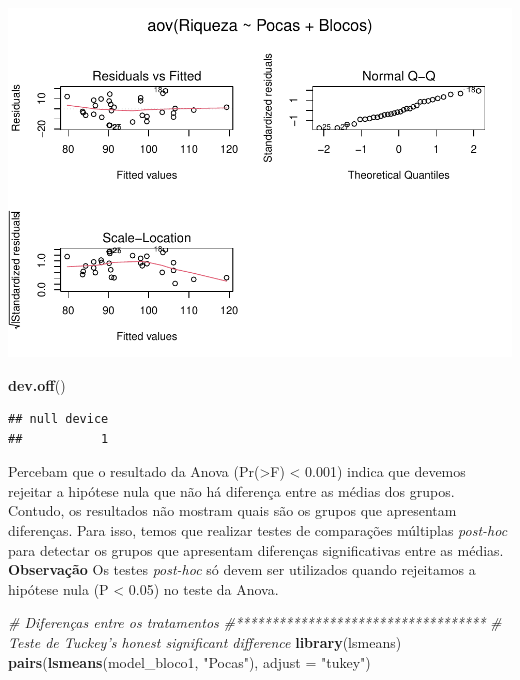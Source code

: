 \documentclass[
]{book}
\newenvironment{Shaded}{\begin{snugshade}}{\end{snugshade}}
\newcommand{\CommentTok}[1]{\textcolor[rgb]{0.56,0.35,0.01}{\textit{#1}}}
\newcommand{\DataTypeTok}[1]{\textcolor[rgb]{0.13,0.29,0.53}{#1}}
\newcommand{\KeywordTok}[1]{\textcolor[rgb]{0.13,0.29,0.53}{\textbf{#1}}}
\newcommand{\NormalTok}[1]{#1}
\newcommand{\StringTok}[1]{\textcolor[rgb]{0.31,0.60,0.02}{#1}}
\begin{document}
\includegraphics{livro_r_ecologia_files/figure-latex/unnamed-chunk-19-1.pdf}

\begin{Shaded}
\begin{Highlighting}[]
\KeywordTok{dev.off}\NormalTok{()}
\end{Highlighting}
\end{Shaded}

\begin{verbatim}
## null device 
##           1
\end{verbatim}

Percebam que o resultado da Anova (Pr(\textgreater F) \textless{} 0.001) indica que devemos rejeitar a hipótese nula que não há diferença entre as médias dos grupos. Contudo, os resultados não mostram quais são os grupos que apresentam diferenças. Para isso, temos que realizar testes de comparações múltiplas \emph{post-hoc} para detectar os grupos que apresentam diferenças significativas entre as médias. \textbf{Observação} Os testes \emph{post-hoc} só devem ser utilizados quando rejeitamos a hipótese nula (P \textless{} 0.05) no teste da Anova.

\begin{Shaded}
\begin{Highlighting}[]
\CommentTok{# Diferenças entre os tratamentos}
\CommentTok{#***********************************}
\CommentTok{# Teste de Tuckey's honest significant difference}
\KeywordTok{library}\NormalTok{(lsmeans)}
\KeywordTok{pairs}\NormalTok{(}\KeywordTok{lsmeans}\NormalTok{(model_bloco1, }\StringTok{"Pocas"}\NormalTok{), }\DataTypeTok{adjust =} \StringTok{"tukey"}\NormalTok{)}
\end{Highlighting}
\end{Shaded}
\end{document}
